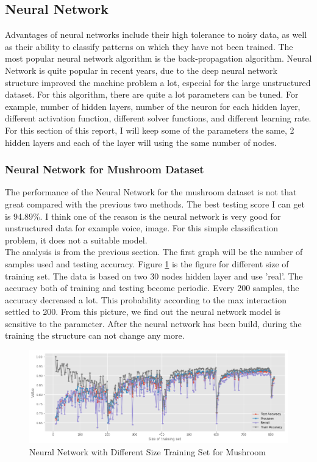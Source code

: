 \documentclass[10pt, conference, compsocconf]{IEEEtran}
\begin{document}
\subsection{Neural Network}
Advantages of neural networks include their high tolerance to noisy data, as well as their ability to classify patterns on which they have not been trained. The most popular neural network algorithm is the back-propagation algorithm\cite{neural}.
Neural Network is quite popular in recent years, due to the deep neural network structure improved the machine problem a lot, especial for the large unstructured dataset. For this algorithm, there are quite a lot parameters can be tuned. For example, number of hidden layers, number of the neuron for each hidden layer, different activation function, different solver functions, and different learning rate. For this section of this report, I will keep some of the parameters the same, 2 hidden layers and each of the layer will using the same number of nodes. 
\subsubsection{Neural Network for Mushroom Dataset}
The performance of the Neural Network for the mushroom dataset is not that great compared with the previous two methods. The best testing score I can get is 94.89\%. I think one of the reason is the neural network is very good for unstructured data for example voice, image. For this simple classification problem, it does not a suitable model. \\
The analysis is from the previous section. The first graph will be the number of samples used and testing accuracy. Figure \ref{fig:mush_nn_learing} is the figure for different size of training set. The data is based on two 30 nodes hidden layer and use 'real'. The accuracy both of training and testing become periodic. Every 200 samples, the accuracy decreased a lot. This probability according to the max interaction settled to 200. From this picture, we find out the neural network model is sensitive to the parameter. After the neural network has been build, during the training the structure can not change any more.  
 
\begin{figure}[h]
	\centering
	\includegraphics[scale = 0.25]{image/mush_nn_learning.png}
	\caption{Neural Network with Different Size Training Set for Mushroom}
	\label{fig:mush_nn_learing}
\end{figure}
\end{document}
